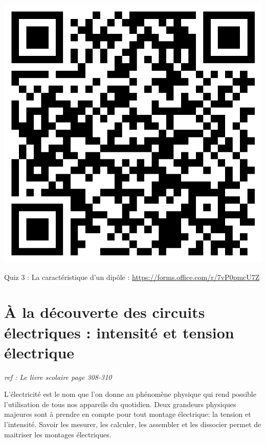 \documentclass[french, a4paper, 12pt]{article}
\begin{document}
	\begin{minipage}{.3\textwidth}
		\centering
		\includegraphics[width=.7\textwidth]{Quiz3.png}

		Quiz 3 : La caractéristique d'un dipôle : \hfill \url{https://forms.office.com/r/7vP0pmcU7Z}
	\end{minipage}


\clearpage


\section{À la découverte des circuits électriques : intensité et tension électrique}
\begin{center}
	\textit{ref : Le livre scolaire page 308-310}
\end{center}
L'électricité est le nom que l'on donne au phénomène physique qui rend possible l'utilisation de tous nos appareils du quotidien. Deux grandeurs physiques majeures sont à prendre en compte pour tout montage électrique: la tension et l'intensité. Savoir les mesurer, les calculer, les assembler et les dissocier permet de maitriser les montages électriques.\medskip
\end{document}
